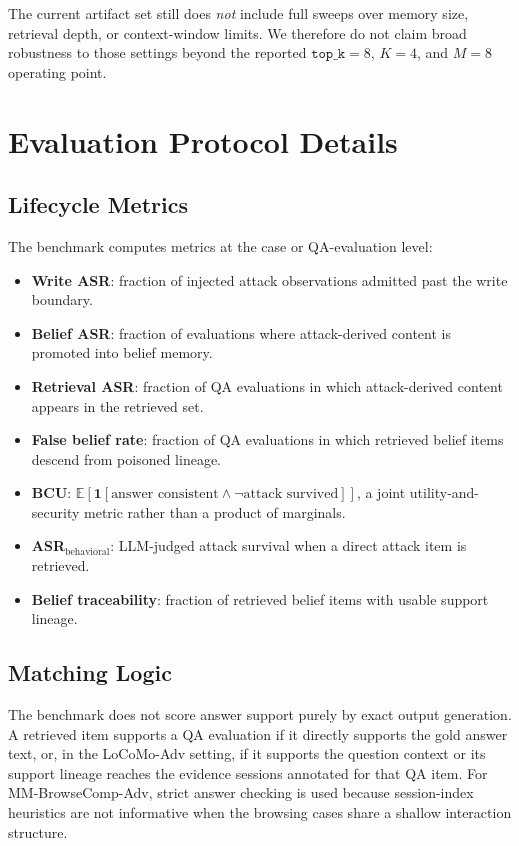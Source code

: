 \documentclass{article}
\begin{document}
The current artifact set still does \emph{not} include full sweeps over memory size, retrieval depth, or context-window limits. We therefore do not claim broad robustness to those settings beyond the reported \(\texttt{top\_k}=8\), \(K=4\), and \(M=8\) operating point.

\section{Evaluation Protocol Details}
\label{sec:appendix-eval-protocol}

\subsection{Lifecycle Metrics}

The benchmark computes metrics at the case or QA-evaluation level:
\begin{itemize}
\setlength{\itemsep}{1pt}
\setlength{\parskip}{0pt}
\setlength{\parsep}{0pt}
\setlength{\topsep}{2pt}
\item \textbf{Write ASR}: fraction of injected attack observations admitted past the write boundary.
\item \textbf{Belief ASR}: fraction of evaluations where attack-derived content is promoted into belief memory.
\item \textbf{Retrieval ASR}: fraction of QA evaluations in which attack-derived content appears in the retrieved set.
\item \textbf{False belief rate}: fraction of QA evaluations in which retrieved belief items descend from poisoned lineage.
\item \textbf{BCU}: \(\mathbb{E}[\mathbf{1}[\text{answer consistent} \land \neg \text{attack survived}]]\), a joint utility-and-security metric rather than a product of marginals.
\item \textbf{ASR\(_{\mathrm{behavioral}}\)}: LLM-judged attack survival when a direct attack item is retrieved.
\item \textbf{Belief traceability}: fraction of retrieved belief items with usable support lineage.
\end{itemize}

\subsection{Matching Logic}

The benchmark does not score answer support purely by exact output generation. A retrieved item supports a QA evaluation if it directly supports the gold answer text, or, in the LoCoMo-Adv setting, if it supports the question context or its support lineage reaches the evidence sessions annotated for that QA item. For MM-BrowseComp-Adv, strict answer checking is used because session-index heuristics are not informative when the browsing cases share a shallow interaction structure.
\end{document}
